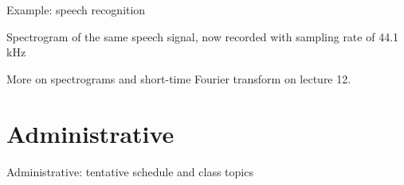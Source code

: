 \documentclass[10pt, handout]{beamer}
\begin{document}
%
\begin{frame}{Example: speech recognition}

Spectrogram of the same speech signal, now recorded with sampling rate of 44.1 kHz
\vspace{0.5cm}

\begin{center}
\end{center}

More on spectrograms and short-time Fourier transform on lecture 12.

\end{frame}


\section{Administrative}

%
\begin{frame}{Administrative: tentative schedule and class topics}

\centering
\resizebox{\linewidth}{!}{}

\end{frame}
\end{document}
